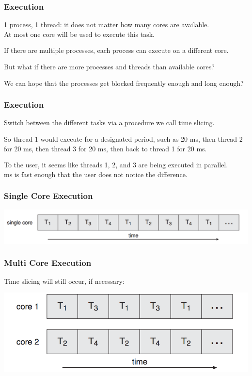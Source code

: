  
\begin{frame}
\frametitle{Execution}

1 process, 1 thread: it does not matter how many cores are available.\\
\quad At most one core will be used to execute this task. 

If there are multiple processes, each process can execute on a different core. 

But what if there are more processes and threads than available cores?

We can hope that the processes get blocked frequently enough and long enough?



\end{frame}

 
\begin{frame}
\frametitle{Execution}

Switch between the different tasks via a procedure we call \alert{time slicing}. 

So thread 1 would execute for a designated period, such as 20 ms, then thread 2 for 20 ms, then thread 3 for 20 ms, then back to thread 1 for 20 ms. 

To the user, it seems like threads 1, 2, and 3 are being executed in parallel.\\
 ms is fast enough that the user does not notice the difference.

\end{frame}

 
\begin{frame}
\frametitle{Single Core Execution}

\begin{center}
	\includegraphics[width=\textwidth]{images/single-core-execution.png}
\end{center}

\end{frame}

 
\begin{frame}
\frametitle{Multi Core Execution}

Time slicing will still occur, if necessary:

\begin{center}
	\includegraphics[width=\textwidth]{images/dual-core-execution.png}
\end{center}


\end{frame}

